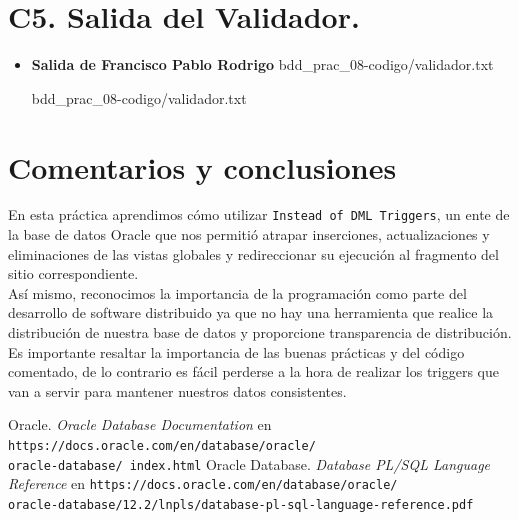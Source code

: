 \documentclass{article}
\newcommand{\codedir}{bdd_prac_08-codigo}
\begin{document}
\section*{C5. Salida del Validador.}

\begin{itemize}
  \item \textbf{Salida de Francisco Pablo Rodrigo}
     {\codedir/validador.txt}
    
    {\codedir/validador.txt}
\end{itemize}

\section*{Comentarios y conclusiones}

En esta práctica aprendimos cómo utilizar \texttt{Instead of DML Triggers},
un ente de la base de datos Oracle que nos permitió atrapar inserciones,
actualizaciones y eliminaciones de las vistas globales y redireccionar su
ejecución al fragmento del sitio correspondiente.\\

Así mismo, reconocimos la importancia de la programación como parte del
desarrollo de software distribuido ya que no hay una herramienta que realice la
distribución de nuestra base de datos y proporcione transparencia de
distribución. Es importante resaltar la importancia de las buenas prácticas y
del código comentado, de lo contrario es fácil perderse a la hora de realizar
los triggers que van a servir para mantener nuestros datos consistentes.

\renewcommand\refname{Bibliografía}
\begin{thebibliography}{99}
     Oracle. \textit{Oracle Database Documentation} en 
        \texttt{https://docs.oracle.com/en/database/oracle/\\oracle-database/%
        index.html}
     Oracle Database. \textit{Database PL/SQL Language 
        Reference} en 
        \texttt{https://docs.oracle.com/en/database/oracle/\\
        oracle-database/12.2/lnpls/database-pl-sql-language-reference.pdf}
\end{thebibliography}
\end{document}
